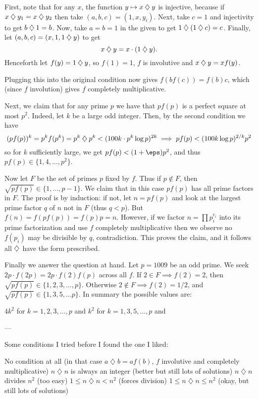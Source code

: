 First, note that for any $x$, the function $y \mapsto x \di y$ is injective,
because if $x \di y_1 = x \di y_2$ then take $(a,b,c)=(1,x,y_i)$.
Next, take $c=1$ and injectivity to get $b \di 1 = b$.
Now, take $a=b=1$ in the given to get $1 \di (1 \di c) = c$.
Finally, let $(a,b,c)=(x, 1, 1 \di y)$ to get
\[ x \di y = x \cdot (1 \di y). \]
Henceforth let $f(y) = 1 \di y$, so
$f(1) = 1$, $f$ is involutive and $x \di y = xf(y)$.

Plugging this into the original condition now gives
$f(bf(c)) = f(b)c$, which (since $f$ involution)
gives $f$ completely multiplicative.

Next, we claim that for any prime $p$ we have that
$pf(p)$ is a perfect square at most $p^2$.
Indeed, let $k$ be a large odd integer.
Then, by the second condition we have
\[  (pf(p))^k = p^k f(p^k) = p^k \di p^k
  < (100k \cdot p^k \log p)^{2k}
  \implies pf(p) < (100k\log p)^{2/k} p^2 \]
so for $k$ sufficiently large, we get $pf(p) < (1+\eps) p^2$,
and thus $pf(p) \in \{1, 4, \dots, p^2\}$.

Now let $F$ be the set of primes $p$ fixed by $f$.
Thus if $p \notin F$, then $\sqrt{pf(p)} \in \{1, \dots, p-1\}$.
We claim that in this case $pf(p)$ has all prime factors in $F$.
The proof is by induction:
if not, let $n = pf(p)$ and look at the
largest prime factor $q$ of $n$ not in $F$ (thus $q < p$).
But $f(n) = f(pf(p)) = f(p)p = n$.
However, if we factor $n = \prod p_i^{e_i}$ into its prime factorization
and use $f$ completely multiplicative then we observe
no $f(p_i)$ may be divisible by $q$, contradiction.
This proves the claim, and it follows all $\di$ have the form prescribed.

\medskip

Finally we answer the question at hand.
Let $p = 1009$ be an odd prime.
We seek $2p \cdot f(2p) = 2p \cdot f(2)f(p)$ across all $f$.
If $2 \in F \implies f(2) = 2$,
then $\sqrt{pf(p)} \in \{1, 2, 3, \dots, p\}$.
Otherwise $2 \notin F \implies f(2) = 1/2$,
and $\sqrt{pf(p)} \in \{1, 3, 5, \dots p\}$.
In summary the possible values are:
\begin{itemize}
  \ii $4k^2$ for $k=1,2,3,\dots,p$ and
  \ii $k^2$ for $k=1,3,5,\dots,p$ and
\end{itemize}

---

\def\di{\mathbin{\diamondsuit}}

Some conditions I tried before I found the one I liked:
\begin{itemize}
  \ii No condition at all (in that case $a \di b = a f(b)$,
  $f$ involutive and completely multiplicative)
  \ii $n \di n$ is always an integer (better but still lots of solutions)
  \ii $n \di n$ divides $n^2$ (too easy)
  \ii $1 \le n \di n < n^2$  (forces division)
  \ii $1 \le n \di n \le n^2$ (okay, but still lots of solutions)
\end{itemize}


